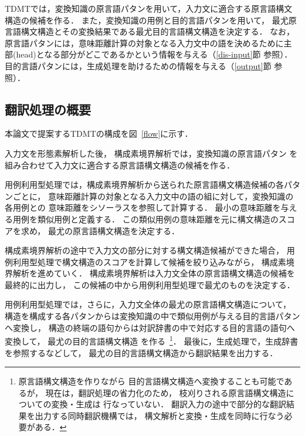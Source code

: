TDMTでは，変換知識の原言語パタンを用いて，入力文に適合する原言語構文構造の候補を作る．
また，変換知識の用例と目的言語パタンを用いて，
最尤原言語構文構造とその変換結果である最尤目的言語構文構造を決定する．
なお，原言語パタンには，意味距離計算の対象となる入力文中の語を決めるために主
部(head)となる部分がどこであるかという情報を与える（\ref{dis-input}節
参照）．目的言語パタンには，生成処理を助けるための情報を与える（\ref{output}節
参照）．

\subsection{翻訳処理の概要}

本論文で提案するTDMTの構成を図~\ref{flow}に示す．

\begin{figure*}[htb]
\begin{center}
\vspace{-2mm}
\caption{TDMTの構成}
\label{flow}
\end{center}
\end{figure*}

\vspace*{-4mm}
入力文を形態素解析した後，
構成素境界解析では，変換知識の原言語パタン
を組み合わせて入力文に適合する原言語構文構造の候補を作る．

用例利用型処理では，構成素境界解析から送られた原言語構文構造候補の各パタンごとに，
意味距離計算の対象となる入力文中の語の組に対して，変換知識の各用例との
意味距離をシソーラスを参照して計算する．
最小の意味距離を与える用例を類似用例と定義する．
この類似用例の意味距離を元に構文構造のスコアを求め，
最尤の原言語構文構造を決定する．

構成素境界解析の途中で入力文の部分に対する構文構造候補ができた場合，
用例利用型処理で構文構造のスコアを計算して候補を絞り込みながら，
構成素境界解析を進めていく．
構成素境界解析は入力文全体の原言語構文構造の候補を最終的に出力し，
この候補の中から用例利用型処理で最尤のものを決定する．

用例利用型処理では，さらに，入力文全体の最尤の原言語構文構造について，
構造を構成する各パタンからは変換知識の中で類似用例が与える目的言語パタンへ変換し，
構造の終端の語句からは対訳辞書の中で対応する目的言語の語句へ変換して，
最尤の目的言語構文構造
を作る~\footnote{原言語構文構造を作りながら
目的言語構文構造へ変換することも可能であるが，
現在は，翻訳処理の省力化のため，
枝刈りされる原言語構文構造についての変換・生成は
行なっていない．
翻訳入力の途中で部分的な翻訳結果を出力する同時翻訳機構では，
構文解析と変換・生成を同時に行なう必要がある．}． 
最後に，生成処理で，生成辞書を参照するなどして，
最尤の目的言語構文構造から翻訳結果を出力する．

